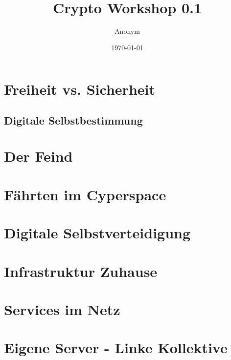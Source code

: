 \documentclass{beamer}
\begin{document}
\title{Crypto Workshop 0.1}   
\author{Anonym} 
\date{\today} 

\frame{\titlepage} 


\section{Freiheit vs. Sicherheit} 
\subsection{Digitale Selbstbestimmung} 

\section{Der Feind} 

\section{Fährten im Cyperspace} 
\section{Digitale Selbstverteidigung} 


\section{Infrastruktur Zuhause} 

\section{Services im Netz} 

\section{Eigene Server - Linke Kollektive} 
\end{document}
